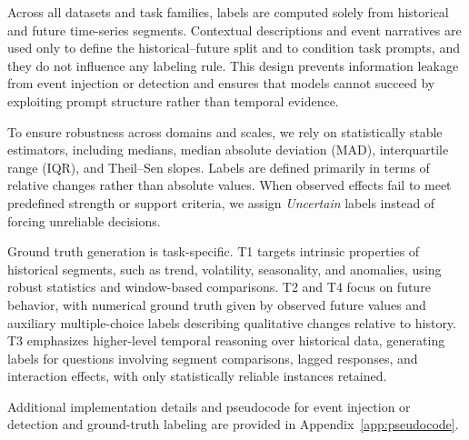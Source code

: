 Across all datasets and task families, labels are computed solely from historical and future time-series segments.
Contextual descriptions and event narratives are used only to define the historical--future split and to condition task prompts, and they do not influence any labeling rule.
This design prevents information leakage from event injection or detection and ensures that models cannot succeed by exploiting prompt structure rather than temporal evidence.

To ensure robustness across domains and scales, we rely on statistically stable estimators, including medians, median absolute deviation (MAD), interquartile range (IQR), and Theil--Sen slopes.
Labels are defined primarily in terms of relative changes rather than absolute values.
When observed effects fail to meet predefined strength or support criteria, we assign \emph{Uncertain} labels instead of forcing unreliable decisions.

Ground truth generation is task-specific.
T1 targets intrinsic properties of historical segments, such as trend, volatility, seasonality, and anomalies, using robust statistics and window-based comparisons.
T2 and T4 focus on future behavior, with numerical ground truth given by observed future values and auxiliary multiple-choice labels describing qualitative changes relative to history.
T3 emphasizes higher-level temporal reasoning over historical data, generating labels for questions involving segment comparisons, lagged responses, and interaction effects, with only statistically reliable instances retained.

Additional implementation details and pseudocode for event injection or detection and ground-truth labeling are provided in Appendix~\ref{app:pseudocode}.
